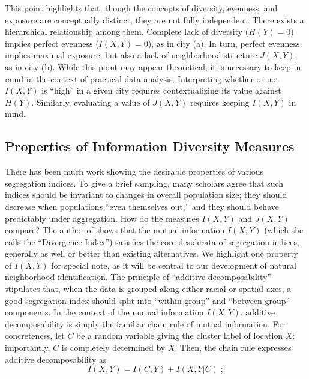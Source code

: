 	This point highlights that, though the concepts of diversity, evenness, and exposure are conceptually distinct, they are not fully independent. There exists a hierarchical relationship among them. Complete lack of diversity ($H(Y) = 0$) implies perfect evenness ($I(X,Y) = 0$), as in city (a). In turn, perfect evenness implies maximal exposure, but also a lack of neighborhood structure $J(X,Y)$, as in city (b). While this point may appear theoretical, it is necessary to keep in mind in the context of practical data analysis. Interpreting whether or not $I(X,Y)$ is ``high'' in a given city requires contextualizing its value against $H(Y)$. Similarly, evaluating a value of $J(X,Y)$ requires keeping $I(X,Y)$ in mind. 

\subsection*{Properties of Information Diversity Measures}
	There has been much work showing the desirable properties of various segregation indices. To give a brief sampling, many scholars agree that such indices should be invariant to changes in overall population size; they should decrease when populations ``even themselves out,'' and they should behave predictably under aggregation. How do the measures $I(X,Y)$ and $J(X,Y)$ compare? The author of \cite{Roberto2015a} shows that the mutual information $I(X,Y)$ (which she calls the ``Divergence Index'') satisfies the core desiderata of segregation indices, generally as well or better than existing alternatives. We highlight one property of $I(X,Y)$ for special note, as it will be central to our development of natural neighborhood identification. The principle of ``additive decomposability'' \cite{Reardon2002} stipulates that, when the data is grouped along either racial or spatial axes, a good segregation index should split into ``within group'' and ``between group'' components. In the context of the mutual information $I(X,Y)$, additive decomposability is simply the familiar chain rule of mutual information. For concreteness, let $C$ be a random variable giving the cluster label of location $X$; importantly, $C$ is completely determined by $X$. Then, the chain rule expresses additive decomposability as 
	\begin{equation}
		I(X,Y) = I(C,Y) + I(X,Y|C)\;; \label{eq:information_decomp}
	\end{equation}
